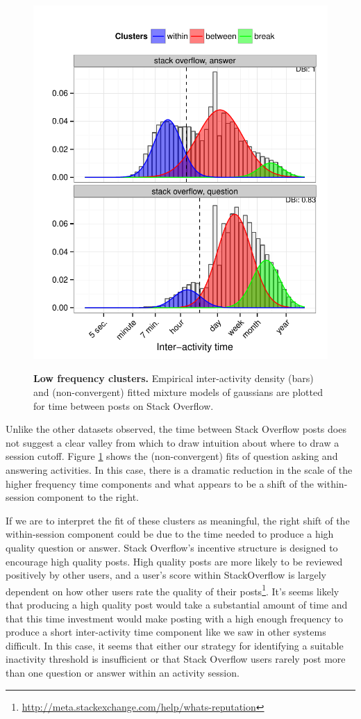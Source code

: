 \begin{figure}
\centering
\includegraphics[width=.45\textwidth]{figures/weird_so_clusters.pdf}
\label{fig:stack_overflow_clusters}
\caption{
    \textbf{Low frequency clusters.} Empirical inter-activity density (bars) and (non-convergent) fitted mixture models of gaussians are plotted for time between posts on Stack Overflow.
}
\end{figure}
Unlike the other datasets observed, the time between Stack Overflow posts does not suggest a clear valley from which to draw intuition about where to draw a session cutoff.  Figure \ref{fig:stack_overflow_clusters} shows the (non-convergent) fits of question asking and answering activities.  In this case, there is a dramatic reduction in the scale of the higher frequency time components and what appears to be a shift of the within-session component to the right.

If we are to interpret the fit of these clusters as meaningful, the right shift of the within-session component could be due to the time needed to produce a high quality question or answer.  Stack Overflow's incentive structure is designed to encourage high quality posts.  High quality posts are more likely to be reviewed positively by other users, and a user's score within StackOverflow is largely dependent on how other users rate the quality of their posts\footnote{\url{http://meta.stackexchange.com/help/whats-reputation}}.  It's seems likely that producing a high quality post would take a substantial amount of time and that this time investment would make posting with a high enough frequency to produce a short inter-activity time component like we saw in other systems difficult.  In this case, it seems that either our strategy for identifying a suitable inactivity threshold is insufficient or that Stack Overflow users rarely post more than one question or answer within an activity session.
